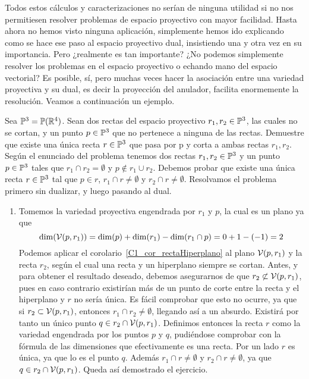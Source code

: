 Todos estos cálculos y caracterizaciones no serían de ninguna utilidad si no nos permitiesen resolver problemas de espacio proyectivo con mayor facilidad. Hasta ahora no hemos visto ninguna aplicación, simplemente hemos ido explicando como se hace ese paso al espacio proyectivo dual, insistiendo una y otra vez en su importancia. Pero ¿realmente es tan importante? ¿No podemos simplemente resolver los problemas en el espacio proyectivo o echando mano del espacio vectorial? Es posible, sí, pero muchas veces hacer la asociación entre una variedad proyectiva y su dual, es decir la proyección del anulador, facilita enormemente la resolución. Veamos a continuación un ejemplo.
\begin{exa}
	Sea $\mathbb{P}^3=\mathbb{P}(\mathbb{R}^4)$. Sean dos rectas del espacio proyectivo $r_1,r_2\in\mathbb{P}^3$, las cuales no se cortan, y un punto $p\in\mathbb{P}^3$ que no pertenece a ninguna de las rectas. Demuestre que existe una única recta $r\in\mathbb{P}^3$ que pasa por p y corta a ambas rectas $r_1, r_2$.\\
	
	Según el enunciado del problema tenemos dos rectas $r_1,r_2\in\mathbb{P}^3$ y un punto $p\in\mathbb{P}^3$ tales que $r_1\cap r_2=\emptyset$ y $p\not\in r_1\cup r_2$. Debemos probar que existe una única recta $r\in\mathbb{P}^3$ tal que $p\in r$, $r_1\cap r\not=\emptyset$ y $r_2\cap r\not=\emptyset$. Resolvamos el problema primero sin dualizar, y luego pasando al dual.
	\begin{enumerate}
		\item Tomemos la variedad proyectiva engendrada por $r_1$ y $p$, la cual es un plano ya que
		\begin{equation*}
		\dim(\mathcal{V}(p,r_1))=\dim(p)+\dim(r_1)-\dim(r_1\cap p)=0+1-(-1)=2
		\end{equation*}
		Podemos aplicar el corolario~\ref{C1_cor_rectaHiperplano} al plano $\mathcal{V}(p,r_1)$ y la recta $r_2$, según el cual una recta y un hiperplano siempre se cortan. Antes, y para obtener el resultado deseado, debemos asegurarnos de que $r_2\not\subset\mathcal{V}(p,r_1)$, pues en caso contrario existirían más de un punto de corte entre la recta y el hiperplano y $r$ no sería única. Es fácil comprobar que esto no ocurre, ya que si $r_2\subset\mathcal{V}(p,r_1)$, entonces $r_1\cap r_2\not=\emptyset$, llegando así a un absurdo. Existirá por tanto un único punto $q\in r_2\cap\mathcal{V}(p,r_1)$. Definimos entonces la recta $r$ como la variedad engendrada por los puntos $p$ y $q$, pudiéndose comprobar con la fórmula de las dimensiones que efectivamente es una recta. Por un lado $r$ es única, ya que lo es el punto $q$. Además $r_1\cap r\not=\emptyset$ y $r_2\cap r\not=\emptyset$, ya que $q\in r_2\cap\mathcal{V}(p,r_1)$. Queda así demostrado el ejercicio.
		

\end{enumerate}
\end{exa}
